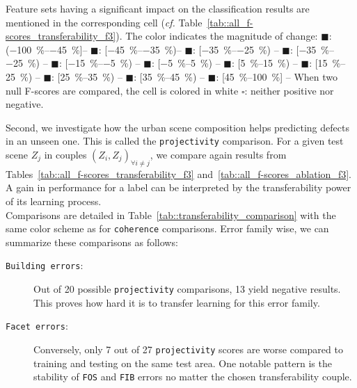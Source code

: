 \begin{table}[htbp]
{                Feature sets having a significant impact on the classification results are mentioned in the corresponding cell (\textit{cf.} Table~\ref{tab::all_f-scores_transferability_f3}).
                The color indicates the magnitude of change: 
                \textcolor{LOSS45}{\(\blacksquare\)}: (\SIrange[range-phrase={,  }]{-100}{-45}{\percent}]--
                \textcolor{LOSS3545}{\(\blacksquare\)}: [\SIrange[range-phrase={,  }]{-45}{-35}{\percent})--
                \textcolor{LOSS2535}{\(\blacksquare\)}: [\SIrange[range-phrase={, }]{-35}{-25}{\percent}) --
                \textcolor{LOSS1525}{\(\blacksquare\)}: [\SIrange[range-phrase={, }]{-35}{-25}{\percent}) --
                \textcolor{LOSS0515}{\(\blacksquare\)}: [\SIrange[range-phrase={, }]{-15}{-5}{\percent}) --
                \textcolor{STBL}{\(\blacksquare\)}: [\SIrange[range-phrase={, }]{-5}{5}{\percent}) --
                \textcolor{GAIN0515}{\(\blacksquare\)}: [\SIrange[range-phrase={, }]{5}{15}{\percent}) --
                \textcolor{GAIN1525}{\(\blacksquare\)}: [\SIrange[range-phrase={, }]{15}{25}{\percent}) --
                \textcolor{GAIN2535}{\(\blacksquare\)}: [\SIrange[range-phrase={, }]{25}{35}{\percent}) --
                \textcolor{GAIN3545}{\(\blacksquare\)}: [\SIrange[range-phrase={, }]{35}{45}{\percent}) --
                \textcolor{GAIN45}{\(\blacksquare\)}: [\SIrange[range-phrase={, }]{45}{100}{\percent}] --
                When two null F-scores are compared, the cell is colored in white \(\square\): neither positive nor negative.
            }
        \end{table}

        Second, we investigate how the urban scene composition helps predicting defects in an unseen one.
        This is called the \texttt{projectivity} comparison.
        For a given test scene $Z_j$ in couples $(Z_i, Z_j)_{\forall i \neq j}$, we compare again results from Tables~\ref{tab::all_f-scores_transferability_f3} and~\ref{tab::all_f-scores_ablation_f3}.
        A gain in performance for a label can be interpreted by the transferability power of its learning process.\\

        Comparisons are detailed in Table~\ref{tab::transferability_comparison} with the same color scheme as for \texttt{coherence} comparisons.
        Error family wise, we can summarize these comparisons as follows:
        \begin{description}
            \item[\texttt{Building errors}:] Out of 20 possible \texttt{projectivity} comparisons, 13 yield negative results.
                    This proves how hard it is to transfer learning for this error family.
            \item[\texttt{Facet errors}:] Conversely, only 7 out of 27 \texttt{projectivity} scores are worse compared to training and testing on the same test area.
                    One notable pattern is the stability of \texttt{FOS} and \texttt{FIB} errors no matter the chosen transferability couple.
        \end{description}

